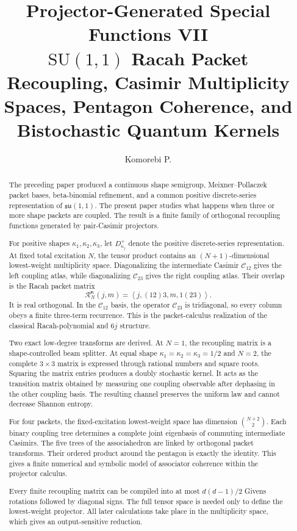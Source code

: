 \documentclass[11pt,openany]{report}
\title{\textbf{Projector-Generated Special Functions VII}\\[0.25em]
\Large $\mathrm{SU}(1,1)$ Racah Packet Recoupling, Casimir Multiplicity Spaces, Pentagon Coherence, and Bistochastic Quantum Kernels}
\author{Komorebi P.}
\date{}
\theoremstyle{definition}
\theoremstyle{remark}
\newcommand{\Cas}{\mathcal C}
\newcommand{\Rcal}{\mathcal R}
\newcommand{\ip}[2]{\left\langle#1,#2\right\rangle}
\begin{document}
\hypersetup{pageanchor=false}
\maketitle

\begin{abstract}
The preceding paper produced a continuous shape semigroup, Meixner--Pollaczek packet bases, beta-binomial refinement, and a common positive discrete-series representation of $\mathfrak{su}(1,1)$. The present paper studies what happens when three or more shape packets are coupled. The result is a finite family of orthogonal recoupling functions generated by pair-Casimir projectors.

For positive shapes $\kappa_1,\kappa_2,\kappa_3$, let $D^+_{\kappa_j}$ denote the positive discrete-series representation. At fixed total excitation $N$, the tensor product contains an $(N+1)$-dimensional lowest-weight multiplicity space. Diagonalizing the intermediate Casimir $\Cas_{12}$ gives the left coupling atlas, while diagonalizing $\Cas_{23}$ gives the right coupling atlas. Their overlap is the Racah packet matrix
\[
\boxed{
\Rcal_N^{\boldsymbol\kappa}(j,m)
=
\ip{j,(12)3}{m,1(23)}.
}
\]
It is real orthogonal. In the $\Cas_{12}$ basis, the operator $\Cas_{23}$ is tridiagonal, so every column obeys a finite three-term recurrence. This is the packet-calculus realization of the classical Racah-polynomial and $6j$ structure.

Two exact low-degree transforms are derived. At $N=1$, the recoupling matrix is a shape-controlled beam splitter. At equal shape $\kappa_1=\kappa_2=\kappa_3=1/2$ and $N=2$, the complete $3\times3$ matrix is expressed through rational numbers and square roots. Squaring the matrix entries produces a doubly stochastic kernel. It acts as the transition matrix obtained by measuring one coupling observable after dephasing in the other coupling basis. The resulting channel preserves the uniform law and cannot decrease Shannon entropy.

For four packets, the fixed-excitation lowest-weight space has dimension $\binom{N+2}{2}$. Each binary coupling tree determines a complete joint eigenbasis of commuting intermediate Casimirs. The five trees of the associahedron are linked by orthogonal packet transforms. Their ordered product around the pentagon is exactly the identity. This gives a finite numerical and symbolic model of associator coherence within the projector calculus.

Every finite recoupling matrix can be compiled into at most $d(d-1)/2$ Givens rotations followed by diagonal signs. The full tensor space is needed only to define the lowest-weight projector. All later calculations take place in the multiplicity space, which gives an output-sensitive reduction.


\end{abstract}
\end{document}
